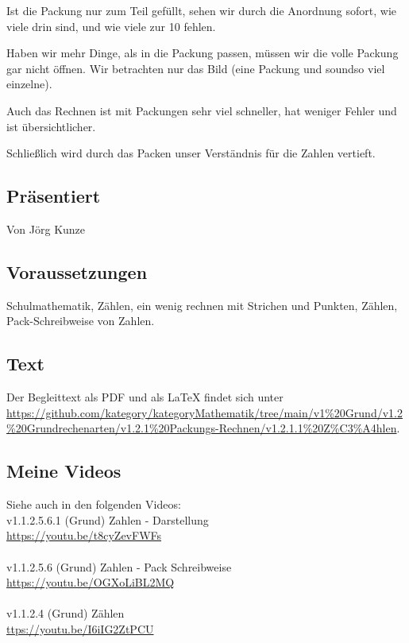 \documentclass[a4paper]{amsart}
\theoremstyle{definition}
\begin{document}
Ist die Packung nur zum Teil gefüllt, sehen wir durch die Anordnung sofort, wie viele drin sind, und wie viele zur 10 fehlen.

Haben wir mehr Dinge, als in die Packung passen, müssen wir die volle Packung gar nicht öffnen. Wir betrachten nur das Bild (eine Packung und soundso viel einzelne).

Auch das Rechnen ist mit Packungen sehr viel schneller, hat weniger Fehler und ist übersichtlicher.

Schließlich wird durch das Packen unser Verständnis für die Zahlen vertieft.

\subsection*{Präsentiert}
Von Jörg Kunze

\subsection*{Voraussetzungen}
Schulmathematik, Zählen, ein wenig rechnen mit Strichen und Punkten, Zählen, Pack-Schreibweise von Zahlen.

\subsection*{Text}
Der Begleittext als PDF und als LaTeX findet sich unter\\
{\tiny\url{https://github.com/kategory/kategoryMathematik/tree/main/v1%20Grund/v1.2%20Grundrechenarten/v1.2.1%20Packungs-Rechnen/v1.2.1.1%20Z%C3%A4hlen}}.

\subsection*{Meine Videos}
Siehe auch in den folgenden Videos:\\
v1.1.2.5.6.1 (Grund) Zahlen - Darstellung\\
\url{https://youtu.be/t8cyZevFWFs}\\
\\
v1.1.2.5.6 (Grund) Zahlen - Pack Schreibweise\\
\url{https://youtu.be/OGXoLiBL2MQ}\\
\\
v1.1.2.4 (Grund) Zählen\\
\url{ttps://youtu.be/I6iIG2ZtPCU}\\
\end{document}
